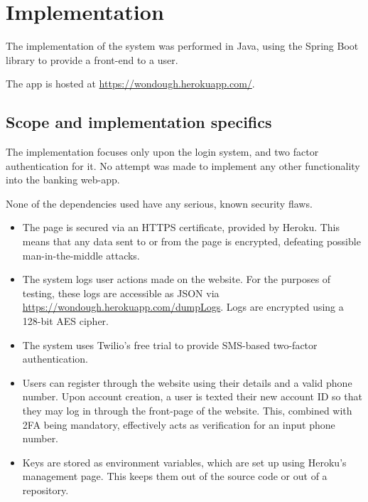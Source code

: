 \section{Implementation}

The implementation of the system was performed in Java, using the Spring Boot library to provide a front-end to a user. 

The app is hosted at \url{https://wondough.herokuapp.com/}.

\subsection{Scope and implementation specifics}

The implementation focuses only upon the login system, and two factor authentication for it. No attempt was made to implement any other functionality into the banking web-app.

None of the dependencies used have any serious, known security flaws.

\begin{itemize}

    \item The page is secured via an HTTPS certificate, provided by Heroku. This means that any data sent to or from the page is encrypted, defeating possible man-in-the-middle attacks. 

    \item The system logs user actions made on the website. For the purposes of testing, these logs are accessible as JSON via \url{https://wondough.herokuapp.com/dumpLogs}. Logs are encrypted using a 128-bit AES cipher. 

    \item The system uses Twilio's free trial to provide SMS-based two-factor authentication. 

    \item Users can register through the website using their details and a valid phone number. Upon account creation, a user is texted their new account ID so that they may log in through the front-page of the website. This, combined with 2FA being mandatory, effectively acts as verification for an input phone number.

    \item Keys are stored as environment variables, which are set up using Heroku's management page. This keeps them out of the source code or out of a repository. 

\end{itemize}

